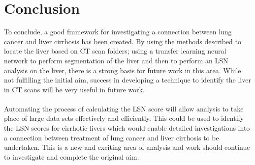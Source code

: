 \documentclass[12pt]{article}
\begin{document}
\section{Conclusion}
To conclude, a good framework for investigating a connection between lung cancer and liver cirrhosis has been created. By using the methods described to locate the liver based on CT scan folders; using a transfer learning neural network to perform segmentation of the liver and then to perform an LSN analysis on the liver, there is a strong basis for future work in this area. While not fulfilling the initial aim, success in developing a technique to identify the liver in CT scans will be very useful in future work.
\\ \\
Automating the process of calculating the LSN score will allow analysis to take place of large data sets effectively and efficiently. This could be used to identify the LSN scores for cirrhotic livers which would enable detailed investigations into a connection between treatment of lung cancer and liver cirrhosis to be undertaken. This is a new and exciting area of analysis and work should continue to investigate and complete the original aim. 

\cleardoublepage


\end{document}
